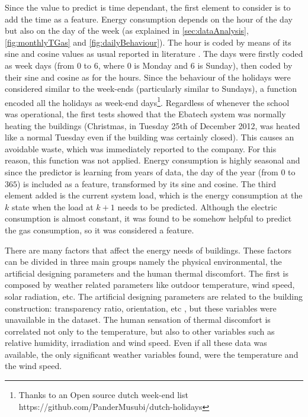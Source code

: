 \documentclass{sig-alternate-sigmod07}
\begin{document}
Since the value to predict is time dependant, the first element to consider is to add the time as a feature. Energy consumption depends on the hour of the day but also on the day of the week (as explained in \cref{sec:dataAnalysis}, \cref{fig:monthlyTGas} and \cref{fig:dailyBehaviour}). The hour is coded by means of its sine and cosine values as usual reported in literature \cite{ohlsson1994predicting, dodier2004statistical, gonzalez2005prediction}. The days were firstly coded as week days (from $0$ to $6$, where $0$ is Monday and 6 is Sunday), then coded by their sine and cosine as for the hours. Since the behaviour of the holidays were considered similar to the week-ends (particularly similar to Sundays), a function encoded all the holidays as week-end days\footnote{Thanks to an Open source dutch week-end list https://github.com/PanderMusubi/dutch-holidays}. Regardless of whenever the school was operational, the first tests showed that the Ebatech system was normally heating the buildings (Christmas, in Tuesday 25th of December 2012, was heated like a normal Tuesday even if the building was certainly closed). This causes an avoidable waste, which was immediately reported to the company. For this reason, this function was not applied. Energy consumption is highly seasonal and since the predictor is learning from years of data, the day of the year (from $0$ to $365$) is included as a feature, transformed by its sine and cosine.
The third element added is the current system load, which is the energy consumption at the $k$ state when the load at $k+1$ needs to be predicted. Although the electric consumption is almost constant, it was found to be somehow helpful to predict the gas consumption, so it was considered a feature.

There are many factors that affect the energy needs of buildings. These factors can be divided in three main groups namely the physical environmental, the artificial designing parameters and the human thermal discomfort. The first is composed by weather related parameters like outdoor temperature, wind speed, solar radiation, etc. The artificial designing parameters are related to the building construction: transparency ratio, orientation, etc \cite{ekici2009prediction}, but these variables were unavailable in the dataset. The human sensation of thermal discomfort is correlated not only to the temperature, but also to other variables such as relative humidity, irradiation and wind speed. Even if all these data was available, the only significant weather variables found, were the temperature and the wind speed.
\end{document}
